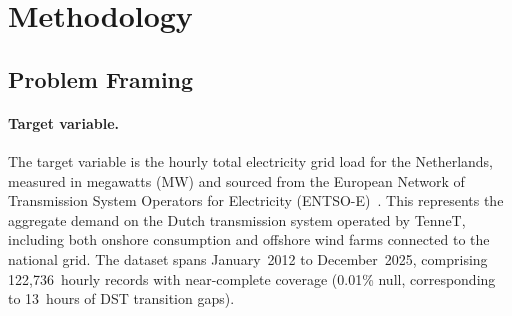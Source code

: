 
\section{Methodology}
\label{sec:methodology}

\subsection{Problem Framing}
\label{subsec:problem_framing}

\paragraph{Target variable.}
The target variable is the hourly total electricity grid load for the Netherlands, measured in megawatts (MW) and sourced from the European Network of Transmission System Operators for Electricity (ENTSO-E)~\cite{entsoe_power_stats}. This represents the aggregate demand on the Dutch transmission system operated by TenneT, including both onshore consumption and offshore wind farms connected to the national grid. The dataset spans January~2012 to December~2025, comprising 122,736~hourly records with near-complete coverage (0.01\% null, corresponding to 13~hours of DST transition gaps).

